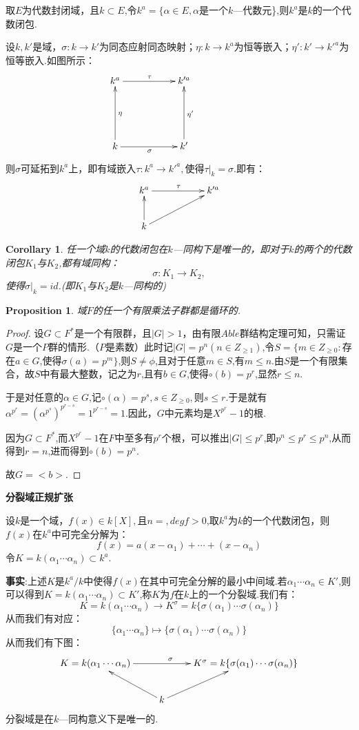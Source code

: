 \documentclass[UTF8]{article}
\newtheorem{cor}{Corollary}[section]
\newtheorem{prop}{Proposition}[section]
\begin{document}
取$E$为代数封闭域，且$k\subset E$,令$k^a=\{\alpha \in E,\alpha$是一个$k$—代数元\},则$k^a$是$k$的一个代数闭包.

设$k,k'$是域，$\sigma :k\rightarrow k'$为同态应射同态映射；$\eta :k\rightarrow k^a$为恒等嵌入；$\eta' :k'\rightarrow k'^a$为恒等嵌入.如图所示：
$$\xymatrix{k^a\ar[rr]^{\tau}&&{k'^a}\\ \\ k\ar[uu]_{\eta}\ar[rr]_{\sigma}&&{k'}\ar[uu]_{\eta'}&&}$$
则$\sigma$可延拓到$ k^a$上，即有域嵌入$\tau :k^a\rightarrow k'^a,$使得$\tau |_k=\sigma.$即有：
$$\xymatrix{k^a\ar[rr]^{\tau}&&{k'^a}\\ k\ar[u] \ar[rru] && }$$

\begin{cor}
	
任一个域$k$的代数闭包在$k$—同构下是唯一的，即对于$k$的两个的代数闭包$K_1$与$K_2$,都有域同构：$$\sigma :K_1\rightarrow K_2,$$使得$\sigma |_k=id$.(即$K_1$与$K_2$是$k$—同构的)
\end{cor}
\begin{prop}域$F$的任一个有限乘法子群都是循环的.
	\end{prop}
\begin{proof}
设$G\subset F^*$是一个有限群，且$|G|>1$，由有限$Able$群结构定理可知，只需证$G$是一个$P$群的情形.（$P$是素数）此时记$ |G|=p^n(n\in Z_{\ge 1})$,令$S=\{m\in Z_{\ge 0}:$存在$a\in G$,使得$\sigma(a)=p^m\}$,则$S\ne \phi $,且对于任意$m\in S$,有$m\le n$.由$S$是一个有限集合，故$S$中有最大整数，记之为$r$,且有$b\in G$,使得$\circ(b)=p^r$,显然$r\le n.$

于是对任意的$\alpha \in G$,记$\circ(\alpha)=p^s,s\in Z_{\ge0},$则$s\le r$.于是就有$\alpha^{p^r}=(\alpha^{p^s})^{p^{r-s}}=1^{p^{r-s}}=1.$因此，$G$中元素均是$X^{p^r}-1$的根.

因为$G\subset F^*$,而$X^{p^r}-1$在$F$中至多有$ p^r $个根，可以推出$|G|\le {p^r}$,即${p^n}\le {p^r}\le {p^n}$,从而得到$r=n$,进而得到$\circ(b)=p^n$.

故$G=<b>$.
\end{proof}

\textbf{分裂域\quad 正规扩张}

设$k$是一个域，$f(x)\in k[X],$且$n=,degf>0$,取$k^a$为$k$的一个代数闭包，则$f(x)$在$k^a$中可完全分解为：$$f(x)=a(x-\alpha_1)+\cdots+(x-\alpha_n)$$令$K=k(\alpha_1 \cdots \alpha_n)\subset k^a.$

\textbf{事实}:上述$K$是$k^a/k$中使得$f(x)$在其中可完全分解的最小中间域.若$\alpha_1 \cdots \alpha_n\in K'$,则可以得到$K=k(\alpha_1 \cdots \alpha_n)\subset K'$,称$K$为$f$在$k$上的一个分裂域.我们有：$$K=k(\alpha_1 \cdots \alpha_n)\rightarrow K^{\sigma}=k\{\sigma(\alpha_1)\cdots\sigma(\alpha_n)\}$$
从而我们有对应：$$\{\alpha_1 \cdots \alpha_n\}\longmapsto \{\sigma(\alpha_1)\cdots\sigma(\alpha_n)\}$$从而我们有下图：$$\xymatrix{K=k(\alpha_1 \cdots \alpha_n)\ar[rr]^{\sigma}&&{K^{\sigma}=k\{\sigma(\alpha_1)\cdots\sigma(\alpha_n)\}}\\& k\ar[lu] \ar[ru]& }$$分裂域是在$k$—同构意义下是唯一的.
\end{document}
